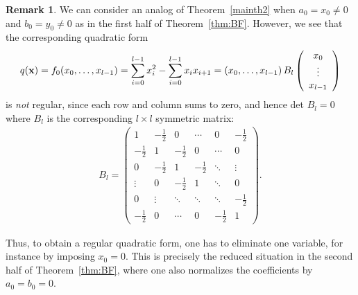 \documentclass[a4paper, 11pt]{amsart}
\theoremstyle{plain}
\theoremstyle{definition}
\newtheorem{remark}[thm]{Remark}
\numberwithin{equation}{section}
\begin{document}
\begin{remark}\label{rem:reg}
We can consider an analog of Theorem~\ref{mainth2} 
when $a_0=x_0\neq0$ and $b_0=y_0\neq 0$ 
as in the first half of Theorem~\ref{thm:BF}. 
However, we see that the corresponding quadratic form
\begin{align*}
q({\bf x})=f_0(x_0,\ldots,x_{l-1})
=\sum_{i=0}^{l-1}x_i^2-\sum_{i=0}^{l-1}x_ix_{i+1}
=(x_0,\ldots,x_{l-1})\,B_l
\left( 
\begin{array}{c}
x_0\\
\vdots\\
x_{l-1}
\end{array}
\right)
\end{align*}
is {\it not} regular, since each row and column sums to zero, and hence det\! $B_l=0$ 
where $B_l$ is the corresponding $l\times l$ symmetric matrix:
%
\renewcommand{\arraystretch}{1.5}
\begin{align*}
B_l=\left(
\begin{array}{c|ccccc}
1 & -\tfrac{1}{2} & 0 & \cdots & 0 & -\tfrac{1}{2}\\\hline
-\tfrac{1}{2}& 1 & -\tfrac{1}{2} & 0 & \cdots & 0\\
0 & -\tfrac{1}{2} & 1 & -\frac{1}{2} & \ddots & \vdots\\
\vdots & 0 & -\tfrac{1}{2} & 1 & \ddots & 0\\
0 & \vdots & \ddots & \ddots & \ddots & -\tfrac{1}{2}\\
-\tfrac{1}{2} & 0 & \cdots & 0 & -\tfrac{1}{2} & 1
\end{array}
\right).
\end{align*}
\renewcommand{\arraystretch}{1.0}
%

Thus, to obtain a regular quadratic form, one has to eliminate one variable, for instance by imposing $x_0=0$. 
This is precisely the reduced situation in the second half of Theorem~\ref{thm:BF}, where one also normalizes the coefficients by $a_0=b_0=0$.
\end{remark}
\end{document}
